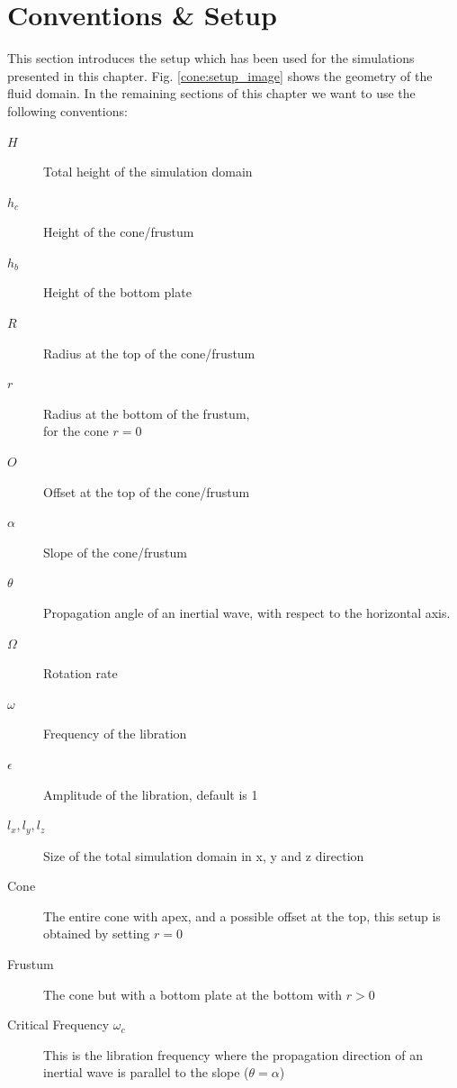 \section{Conventions \& Setup}
\label{cone:convsetup}

This section introduces the setup which has been used for the simulations presented in this chapter.
Fig. \ref{cone:setup_image} shows the geometry of the fluid domain.
In the remaining sections of this chapter we want to use the following conventions:

\begin{multicols}{2}
\begin{description}
    \item[$H$]{Total height of the simulation domain}
    \item[$h_c$]{Height of the cone/frustum}
    \item[$h_b$]{Height of the bottom plate}
    \item[$R$]{Radius at the top of the cone/frustum}
    \item[$r$]{Radius at the bottom  of the frustum,\\ for the cone $r=0$}
    \item[$O$]{Offset at the top of the cone/frustum}
    \item[$\alpha$]{Slope of the cone/frustum}
    \item[$\theta$]{Propagation angle of an inertial wave, with respect to the horizontal axis.}
    \item[$\Omega$]{Rotation rate}
    \item[$\omega$]{Frequency of the libration}
    \item[$\epsilon$]{Amplitude of the libration, default is 1}%
    \item[$l_x, l_y, l_z$]{Size of the total simulation domain in x, y and z direction}
    \item[Cone] {The entire cone with apex, and a possible offset at the top, this setup is obtained by setting $r=0$}
    \item[Frustum]{The cone but with a bottom plate at the bottom with $r>0$}
    \item[Critical Frequency $\omega_c$]{This is the libration frequency where the propagation direction of an inertial wave is parallel to the slope ($\theta=\alpha$)}
\end{description}
\end{multicols}


